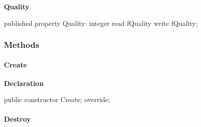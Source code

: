 \documentclass{report}
\newif\ifpdf
\begin{document}
\begin{list}{}
\begin{flushleft}
\ifpdf
\end{flushleft}
\fi


\par  \label{opbitmapformats.TJPEGImage-Quality}
\item[\textbf{Quality}\hfill]
\ifpdf
\begin{flushleft}
\fi
\begin{ttfamily}
published property Quality: integer read fQuality write fQuality;\end{ttfamily}

\ifpdf
\end{flushleft}
\fi


\par  \end{list}
\subsubsection*{\large{\textbf{Methods}}\normalsize\hspace{1ex}\hfill}
\paragraph*{Create}\hspace*{\fill}

\label{opbitmapformats.TJPEGImage-Create}
\begin{list}{}{
\setlength{\itemindent}{0cm}
\setlength{\listparindent}{0cm}
\setlength{\leftmargin}{\evensidemargin}
\addtolength{\leftmargin}{\tmplength}
\settowidth{\labelsep}{X}
\addtolength{\leftmargin}{\labelsep}
\setlength{\labelwidth}{\tmplength}
}
\item[\textbf{Declaration}\hfill]
\ifpdf
\begin{flushleft}
\fi
\begin{ttfamily}
public constructor Create; override;\end{ttfamily}

\ifpdf
\end{flushleft}
\fi

\end{list}
\paragraph*{Destroy}\hspace*{\fill}
\end{document}
